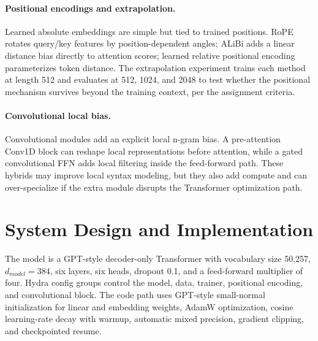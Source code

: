 \documentclass[11pt]{article}
\begin{document}
\paragraph{Positional encodings and extrapolation.}
Learned absolute embeddings are simple but tied to trained positions. RoPE rotates query/key features by position-dependent angles; ALiBi adds a linear distance bias directly to attention scores; learned relative positional encoding parameterizes token distance. The extrapolation experiment trains each method at length 512 and evaluates at 512, 1024, and 2048 to test whether the positional mechanism survives beyond the training context, per the assignment criteria.

\paragraph{Convolutional local bias.}
Convolutional modules add an explicit local n-gram bias. A pre-attention Conv1D block can reshape local representations before attention, while a gated convolutional FFN adds local filtering inside the feed-forward path. These hybrids may improve local syntax modeling, but they also add compute and can over-specialize if the extra module disrupts the Transformer optimization path.

\section{System Design and Implementation}
The model is a GPT-style decoder-only Transformer with vocabulary size 50,257, $d_{model}=384$, six layers, six heads, dropout 0.1, and a feed-forward multiplier of four. Hydra config groups control the model, data, trainer, positional encoding, and convolutional block. The code path uses GPT-style small-normal initialization for linear and embedding weights, AdamW optimization, cosine learning-rate decay with warmup, automatic mixed precision, gradient clipping, and checkpointed resume.

\begin{table}[H]
\centering
\caption{Implementation components used in the final Core ML suite.}
\label{tab:system-components}
\end{table}
\end{document}
